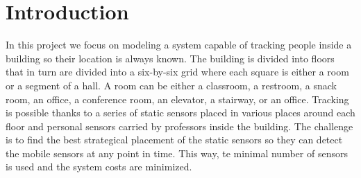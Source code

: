 \section{Introduction}
In this project we focus on modeling a system capable of tracking
people inside a building so their location is always known. 
The building is divided into floors that in turn are divided into a six-by-six
grid where each square is either a room or a segment of a hall. A room can be either
a classroom, a restroom, a snack room, an office, a conference room, an elevator, 
a stairway, or an office.
Tracking is possible thanks to a series of static sensors placed in various places around
each floor and personal sensors carried by professors inside the building. 
The challenge is to find the best strategical placement of the static sensors so
they can detect the mobile sensors at any point in time. This way, te minimal number
of sensors is used and the system costs are minimized.
